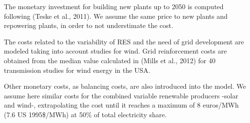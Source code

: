 The monetary investment for building new plants up to 2050 is computed following (Teske et al.,
2011). We assume the same price to new plants and repowering plants, in order to not understimate the cost. 

The costs related to the variability of RES and the need of grid development are modeled taking into account studies for wind. Grid reinforcement costs are obtained from the median value calculated in (Mills et al., 2012)  for 40 transmission studies for wind energy
in the USA.

Other monetary costs, as balancing costs, are also introduced into the model. We assume here similar costs for the combined variable
renewable producers -solar and wind-, extrapolating the cost until it reaches a maximum of 8
euros/MWh (7.6 US 1995\$/MWh) at 50\% of total electricity share.

